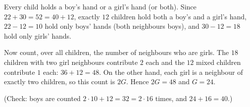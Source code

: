 Every child holds a boy's hand or a girl's hand (or both). Since $22+30=52=40+12$, exactly $12$ children hold both a boy's and a girl's hand, $22-12=10$ hold only boys' hands (both neighbours boys), and $30-12=18$ hold only girls' hands.

Now count, over all children, the number of neighbours who are girls. The $18$ children with two girl neighbours contribute $2$ each and the $12$ mixed children contribute $1$ each: $36+12=48$. On the other hand, each girl is a neighbour of exactly two children, so this count is $2G$. Hence $2G=48$ and $G=\boxed{24}$.

(Check: boys are counted $2\cdot10+12=32=2\cdot 16$ times, and $24+16=40$.)
